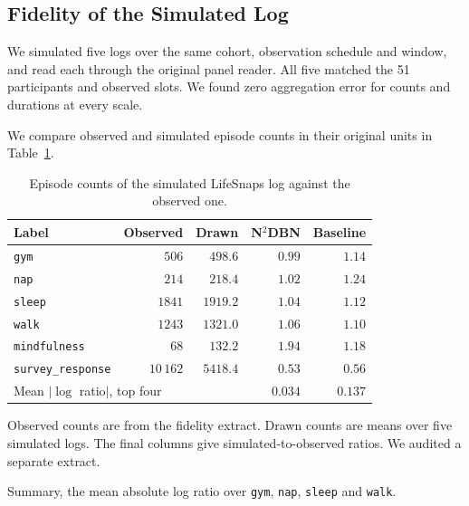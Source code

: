 \documentclass[sigconf]{acmart}
\begin{document}
\subsection{Fidelity of the Simulated Log}
\label{sec:case-study:fidelity}

We simulated five logs over the same cohort, observation schedule and window, and read each through the original panel reader. All five matched the 51 participants and observed slots. We found zero aggregation error for counts and durations at every scale.

We compare observed and simulated episode counts in their original units in Table~\ref{tab:case-volume}.

\begin{table}[t]
\caption{Episode counts of the simulated LifeSnaps log against the observed one.}
\label{tab:case-volume}
\small
\begin{threeparttable}
\begin{tabular}{lrrrr}
\toprule
Label & Observed & Drawn & N$^2$DBN & Baseline \\
\midrule
\texttt{gym} & $506$ & $498.6$ & $\mathbf{0.99}$ & $1.14$ \\
\texttt{nap} & $214$ & $218.4$ & $\mathbf{1.02}$ & $1.24$ \\
\texttt{sleep} & $1841$ & $1919.2$ & $\mathbf{1.04}$ & $1.12$ \\
\texttt{walk} & $1243$ & $1321.0$ & $\mathbf{1.06}$ & $1.10$ \\
\texttt{mindfulness} & $68$ & $132.2$ & $1.94$ & $1.18$ \\
\texttt{survey\_response} & $10\,162$ & $5418.4$ & $0.53$ & $0.56$ \\
\midrule
\multicolumn{2}{l}{Mean $|\log$ ratio$|$, top four} & & $\mathbf{0.034}$ & $0.137$ \\
\bottomrule
\end{tabular}
\begin{tablenotes}[flushleft]\footnotesize
\item Observed counts are from the fidelity extract. Drawn counts are means over five simulated logs. The final columns give simulated-to-observed ratios. We audited a separate extract.
\item Summary, the mean absolute log ratio over \texttt{gym}, \texttt{nap}, \texttt{sleep} and \texttt{walk}.
\end{tablenotes}
\end{threeparttable}
\end{table}
\end{document}
